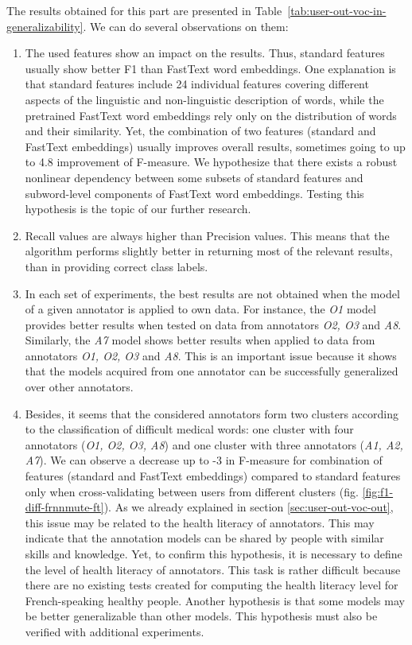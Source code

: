 The results obtained for this part are presented in Table~\ref{tab:user-out-voc-in-generalizability}. We can do several observations on them:
\begin{enumerate}[listparindent=1.5em]
    \item The used features show an impact on the results. Thus, standard features usually show better F1 than FastText word embeddings. One explanation is that standard features include 24 individual features covering different aspects of the linguistic and non-linguistic description of words, while the pretrained FastText word embeddings rely only on the distribution of words and their similarity. Yet, the combination of two features (standard and FastText embeddings) usually improves overall results, sometimes going to up to 4.8 improvement of F-measure.  We hypothesize that there exists a robust nonlinear dependency between some subsets of standard features and subword-level components of FastText word embeddings. Testing this hypothesis is the topic of our further research.
    
    \item Recall values are always higher than Precision values. This means that the algorithm performs slightly better in returning most of the relevant results, than in providing correct class labels. 
    
    \item In each set of experiments, the best results are not obtained when the model of a given annotator is applied to own data. For instance, the {\it O1} model provides better results when tested on data from annotators {\it O2, O3} and {\it A8}.  Similarly, the {\it A7} model shows better results when applied to data from annotators {\it O1, O2, O3} and {\it A8}. This is an important issue because it shows that the models acquired from one annotator can be successfully generalized over other annotators.
    
    \item Besides, it seems that the considered annotators form two clusters according to the classification of difficult medical words: one cluster with four annotators ({\it O1, O2, O3, A8}) and one cluster with three annotators ({\it A1, A2, A7}). We can observe a decrease up to -3 in F-measure for combination of features (standard and FastText embeddings) compared to standard features only when cross-validating between users from different clusters (fig. \ref{fig:f1-diff-frnnmute-ft}). As we already explained in section \ref{sec:user-out-voc-out}, this issue may be related to the health literacy of annotators. This may indicate that the annotation models can be shared by people with similar skills and knowledge. Yet, to confirm this hypothesis, it is necessary to define the level of health literacy of annotators. This task is rather difficult because there are no existing tests created for computing the health literacy level for French-speaking healthy people. Another hypothesis is that some models may be better generalizable than other models. This hypothesis must also be verified with additional experiments.
    
\end{enumerate}



